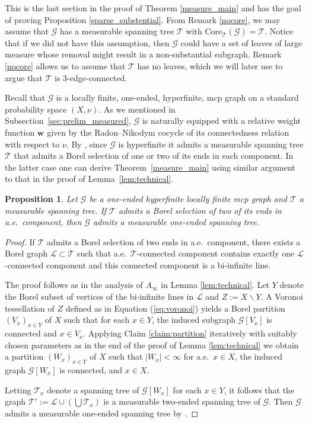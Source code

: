 \documentclass[letterpaper,11pt,reqno]{amsart}
\theoremstyle{bfnote}
\newtheorem{prop}[theorem]{Proposition}
\theoremstyle{definition}
\newcommand{\0}{\varnothing}
\newcommand{\w}{\mathbf{w}}
\numberwithin{equation}{section}
\begin{document}
This is the last section in the proof of Theorem \ref{measure_main} and has the goal of proving Proposition \ref{sparse_substential}.  From Remark \ref{nocore}, we may assume that $\mathcal{G}$ has a measurable spanning tree $\mathcal{T}$ with $\mathrm{Core}_{\mathcal{T}}(\mathcal{G})=\mathcal T$.  Notice that if we did not have this assumption, then $\mathcal{G}$ could have a set of leaves of large measure whose removal might result in a non-substantial subgraph.  Remark \ref{nocore} allows us to assume that $\mathcal{T}$ has no leaves, which we will later use to argue that $\mathcal{T}$ is $3$-edge-connected.

Recall that $\mathcal{G}$ is a locally finite, one-ended, hyperfinite, mcp graph on a standard probability space $(X,\nu)$. As we mentioned in Subsection~\ref{sec:prelim_measured}, $\mathcal{G}$ is naturally equipped with a relative weight function $\w$ given by the Radon--Nikodym cocycle of its connectedness relation with respect to $\nu$. By \cite[Lemma 3.21]{jkl}, since $\mathcal{G}$ is hyperfinite it admits a measurable spanning tree $\mathcal{T}$ that admits a Borel selection of one or two of its ends in each component. In the latter case one can derive Theorem~\ref{measure_main} using similar argument to that in the proof of Lemma~\ref{lem:technical}.

\begin{prop}\label{2 ends}
    Let $\mathcal G$ be a one-ended hyperfinite locally finite mcp graph and $\mathcal T$ a measurable spanning tree. If $\mathcal T$ admits a Borel selection of two of its ends in a.e.\ component, then $\mathcal{G}$ admits a measurable one-ended spanning tree.
\end{prop}

\begin{proof}
    If $\mathcal T$ admits a Borel selection of two ends in a.e.\ component, there exists a Borel graph $\mathcal L \subset \mathcal T$ such that a.e.\ $\mathcal T$-connected component contains exactly one $\mathcal L$-connected component and this connected component is a bi-infinite line. 
    
    The proof follows as in the analysis of $A_\infty$ in Lemma \ref{lem:technical}. Let $Y$ denote the Borel subset of vertices of the bi-infinite lines in $\mathcal L$ and $Z := X \backslash Y$. A Voronoi tessellation of $Z$ defined as in Equation (\ref{eq:voronoi}) yields a Borel partition $(V_x)_{x\in Y}$ of $X$ such that for each $x\in Y$, the induced subgraph $\mathcal G [V_x]$ is connected and $x \in V_x$. Applying Claim \ref{claim:partition} iteratively with suitably chosen parameters as in the end of the proof of Lemma \ref{lem:technical} we obtain a partition $(W_x)_{x\in Y}$ of $X$ such that $|W_x|<\infty$ for a.e.\ $x\in X$, the induced graph $\mathcal G[W_x]$ is connected, and $x\in X$. 
    
    Letting $\mathcal T_x$ denote a spanning tree of $\mathcal G[W_x]$ for each $x\in Y$, it follows that the graph $\mathcal T' := \mathcal L \cup \left(\bigcup \mathcal T_x\right)$ is a measurable two-ended spanning tree of $\mathcal G$. Then $\mathcal G$ admits a measurable one-ended spanning tree by \cite[Lemma 2.9]{cgmtd}.    
\end{proof}
\end{document}
